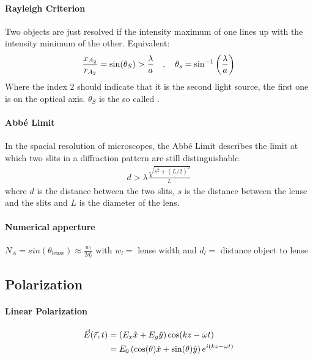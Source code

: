 \paragraph{Rayleigh Criterion}
Two objects are just resolved if the intensity maximum of one lines up with the
intensity minimum of the other. Equivalent:
\begin{align*}
    \frac{x_{A_2}}{r_{A_2}} = \sin(\theta_S) > \frac{\lambda}{a}
    \hspace{10pt} , \hspace{10pt}
    \theta_s = \sin^{-1} \left( \frac{\lambda}{a} \right)
\end{align*}
Where the index $2$ should indicate that it is the second light source, the first
one is on the optical axis. $\theta_S$ is the so called .


\paragraph{Abbé Limit}
In the spacial resolution of microscopes, the Abbé Limit describes the limit
at which two slits in a diffraction pattern are still distinguishable.
\begin{align*}
    d > \lambda \frac{\sqrt{s^2 + (L/2)^2}}{L}
\end{align*}
where $d$ is the distance between the two slits, $s$ is the distance between the
lense and the slits and $L$ is the diameter of the lens.

\paragraph{Numerical apperture}
$N_A = sin(\theta_{\text{lense}}) \approx \frac{w_l}{2 d_l}$
with $w_l = $ lense width and $d_l = $ distance object to lense


\subsection{Polarization}

\paragraph{Linear Polarization}
\begin{align*}
    \vec{E}(\vec{r},t) &= \left( E_x \hat{x} + E_y \hat{y} \right) \cos(kz-\omega t)
    \\
    &= E_0 \left( \cos(\theta) \hat{x} + \sin(\theta) \hat{y} \right) e^{i(kz - \omega t)}
\end{align*}

